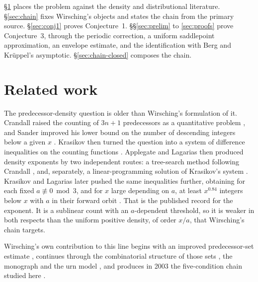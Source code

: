 \documentclass[11pt]{article}
\theoremstyle{definition}
\theoremstyle{remark}
\begin{document}
\S\ref{sec:related} places the problem against the density and
distributional literature. \S\ref{sec:chain} fixes Wirsching's objects
and states the chain from the primary source. \S\ref{sec:conj1} proves
Conjecture~1. \S\S\ref{sec:prelim} to \ref{sec:proofs} prove
Conjecture~3, through the periodic correction, a uniform saddlepoint
approximation, an envelope estimate, and the identification with Berg
and Kr\"uppel's asymptotic. \S\ref{sec:chain-closed} composes the
chain.


\section{Related work}
\label{sec:related}

The predecessor-density question is older than Wirsching's formulation
of it. Crandall raised the counting of $3n+1$ predecessors as a
quantitative problem \cite{Crandall1978}, and Sander improved his lower
bound on the number of descending integers below a given $x$
\cite{Sander1990}. Krasikov then turned the question into a system of
difference inequalities on the counting functions
\cite{Krasikov1989}. Applegate and Lagarias then produced density
exponents by two independent routes: a tree-search method following
Crandall \cite{ApplegateLagarias1995I}, and, separately, a
linear-programming solution of Krasikov's system
\cite{ApplegateLagarias1995II}. Krasikov and Lagarias later pushed the same
inequalities further, obtaining for each fixed $a\not\equiv0\bmod3$, and
for $x$ large depending on $a$, at least $x^{0.84}$ integers below $x$
with $a$ in their forward orbit \cite{KrasikovLagarias2003}. That is the
published record for the exponent. It is a sublinear count with
an $a$-dependent threshold, so it is weaker in both respects than the
uniform positive density, of order $x/a$, that Wirsching's chain
targets.

Wirsching's own contribution to this line begins with an improved
predecessor-set estimate \cite{Wirsching1993}, continues through the
combinatorial structure of those sets \cite{Wirsching1996}, the
monograph \cite{Wirsching1998Book} and the urn model
\cite{Wirsching1998Urns}, and produces in 2003 the five-condition chain
studied here \cite{Wirsching2003}.
\end{document}
